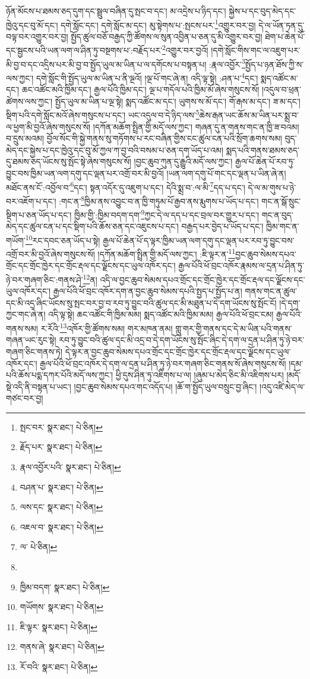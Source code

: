 ཉོན་མོངས་པ་ཐམས་ཅད་དུག་དང་སྦྲུལ་བཞིན་དུ་སྤང་བ་དང་། མ་འདྲེས་པ་ཉིད་དང་། སྐྱེས་པ་དང་བུད་མེད་དང་ཁྱེའུ་དང་བུ་མོ་དང་། དགེ་སློང་དང་། དགེ་སློང་མ་དང་། མུ་སྟེགས་པ་:སྤངས་པར་\footnote{སྤང་བར་  སྣར་ཐང་།  པེ་ཅིན། }འགྱུར་བར་བྱ། དེ་ལ་ཡོན་ཏན་དུ་བལྟ་བར་འགྱུར་བར་བྱ། སྤྱོད་ཚུལ་བཅོ་བརྒྱད་ཀྱི་ཚོགས་ལ་སུན་འབྱིན་པ་ཅན་དུ་མི་འགྱུར་བར་བྱ། ཐེག་པ་ཆེན་པོ་དང་སྦྱངས་པའི་ཡན་ལག་ལ་ཤིན་ཏུ་བསྔགས་པ་:བརྗོད་པར་\footnote{རྗོད་པར་  སྣར་ཐང་།  པེ་ཅིན། }འགྱུར་བར་བྱའོ། །དགེ་སློང་གིས་གང་ལ་འཇུག་པར་མི་བྱ་བ་དང་འདྲིས་པར་མི་བྱ་བ་སྤྱོད་ཡུལ་མ་ཡིན་པ་ལ་དགོངས་པ་བསྟན་པ། :རྣལ་འབྱོར་\footnote{རྣལ་འབྱོར་པའི་  སྣར་ཐང་།  པེ་ཅིན། }སྤྱོད་པ་ཉན་ཐོས་ཀྱི་ས་ལས་ཀྱང་། དགེ་སློང་གི་སྤྱོད་ཡུལ་མ་ཡིན་པ་ནི་ལྔའོ། །ལྔ་པོ་གང་ཞེ་ན། འདི་ལྟ་སྟེ། :ཤན་པ་\footnote{བཤན་པ་  སྣར་ཐང་།  པེ་ཅིན། }དང་། སྨད་འཚོང་མ་དང་། ཆང་འཚོང་མའི་ཁྱིམ་དང་། རྒྱལ་པོའི་ཁྱིམ་དང་། ལྔ་པ་གདོལ་པའི་ཁྱིམ་མོ་ཞེས་གསུངས་སོ། །འདུལ་བ་ཕྲན་ཚེགས་ལས་ཀྱང་། སྤྱོད་ཡུལ་མ་ཡིན་པ་ལྔ་སྟེ། སྨད་འཚོང་མ་དང་། ཡུགས་ས་མོ་དང་། གོ་རྒས་མ་དང་། ཟ་མ་དང་། སྡིག་པའི་དགེ་སློང་མའོ་ཞེས་གསུངས་པ་དང་། ཡང་འདུལ་བ་དེ་ཉིད་ལས་\footnote{ལས་དང་  སྣར་ཐང་།  པེ་ཅིན། }ཆེས་རྒན་ཡང་ཆོས་མ་ཡིན་པར་སྨྲ་བ་ལ་ཕྱག་མི་བྱའོ་ཞེས་གསུངས་སོ། །དཀོན་མཆོག་སྤྲིན་གྱི་མདོ་ལས་ཀྱང་། གཞན་དུ་ན་གནས་གང་ན་ཁྱི་ཟ་བའམ། བ་དྲུས་མའམ། བྱོལ་སོང་གི་སྐྱེ་གནས་སུ་གཏོགས་པ་རང་བཞིན་གྱིས་ངང་ཚུལ་ངན་པའི་སྲོག་ཆགས་སམ། བུད་མེད་དང་སྐྱེས་པ་དང་ཁྱེའུ་དང་བུ་མོ་ཀྱལ་ཀ་བྱ་བའི་བསམ་པ་ཅན་དག་ཡོད་པ་འམ། སྨད་པའི་གནས་ཐམས་ཅད་དུ་ཐམས་ཅད་ཡོངས་སུ་སྤོང་སྟེ་ཞེས་གསུངས་སོ། །བྱང་ཆུབ་ཀུན་དུ་རྒྱུའི་མདོ་ལས་ཀྱང་། རྒྱལ་པོ་ཆེན་པོ་རབ་ཏུ་བྱུང་བས་ཁྱིམ་ཡན་ལག་དགུ་དང་ལྡན་པར་འགྲོ་བར་མི་བྱའོ། །ཡན་ལག་དགུ་པོ་གང་དང་ལྡན་པ་ཡིན་ཞེ་ན། མཐོང་ནས་ངོ་:འབྱོལ་བ་\footnote{འཇལ་བ་  སྣར་ཐང་།  པེ་ཅིན། }དང་། སྟན་འདོར་དུ་འཇུག་པ་དང་། དེའི་སྨྲ་བ་:ལ་མི་\footnote{ལ་  པེ་ཅིན། }དད་པ་དང་། དེ་ལ་མ་གུས་པ་ཉེ་བར་འཇོག་པ་དང་། :གང་ན་\footnote{}ཁྱིམ་ནས་འབྱུང་བ་ན་ཁྱི་གཏུམ་པོ་རྒྱབ་ནས་རྨུགས་པ་ཡོད་པ་དང་། གང་ན་སྒོ་སྲུང་སྡིག་པ་ཅན་ཡོད་པ་དང་། ཁྱིམ་གྱི་:ཁྱིམ་བདག་དག་\footnote{ཁྱིམ་བདག་  སྣར་ཐང་།  པེ་ཅིན། }ཀྱང་དེ་ལ་དད་པ་དང་བྲལ་བར་གྱུར་པ་དང་། གང་ན་བུད་མེད་དང་ཚུལ་ངན་པ་དང་སྡིག་པའི་ཆོས་ཅན་དང་འཇུངས་པ་དང་། བརྒྱད་པར་བྱེད་པ་ཡོད་པ་དང་། ཁྱིམ་གང་ན་གཡོག་\footnote{གཡོགས་  སྣར་ཐང་།  པེ་ཅིན། }རང་དབང་ཅན་ཡོད་པ་སྟེ། རྒྱལ་པོ་ཆེན་པོ་ད་ལྟར་ཁྱིམ་ཡན་ལག་དགུ་དང་ལྡན་པར་རབ་ཏུ་བྱུང་བས་འགྲོ་བར་མི་བྱའོ་ཞེས་གསུངས་སོ། །དཀོན་མཆོག་སྤྲིན་གྱི་མདོ་ལས་ཀྱང་། :ཇི་ལྟར་ན་\footnote{ཇི་ལྟར་  སྣར་ཐང་།  པེ་ཅིན། }བྱང་ཆུབ་སེམས་དཔའ་གྲོང་དང་གྲོང་ཁྱེར་དང་གྲོང་རྡལ་དང་ལྗོངས་དང་ཡུལ་འཁོར་དང་། རྒྱལ་པོའི་ཕོ་བྲང་འཁོར་རྣམས་ལ་དྲན་པ་ཤིན་ཏུ་ཉེ་བར་གཞག་ཅིང་:གནས་ཤེ་\footnote{གནས་ཞེ་  སྣར་ཐང་།  པེ་ཅིན། }ན། འདི་ལ་བྱང་ཆུབ་སེམས་དཔའ་གྲོང་དང་གྲོང་ཁྱེར་དང་གྲོང་རྡལ་དང་ལྗོངས་དང་ཡུལ་འཁོར་དང་། རྒྱལ་པོའི་ཕོ་བྲང་འཁོར་དག་ན་བྱང་ཆུབ་སེམས་དཔའི་སྤྱད་པ་སྤྱོད་པ་ན། གནས་གང་ན་ཚུལ་དང་མི་འདྲ་ཞིང་ཡོངས་སུ་སྤང་བར་བྱ་བ་རབ་ཏུ་བྱུང་བའི་ཚུལ་དང་མི་མཐུན་པ་དེ་དག་ཡོངས་སུ་སྤོང་ངོ། །དེ་དག་ཀྱང་གང་ཞེ་ན། འདི་ལྟ་སྟེ། ཆང་འཚོང་གི་ཁྱིམ་མམ། སྨད་འཚོང་མའི་ཁྱིམ་མམ། རྒྱལ་པོའི་ཕོ་བྲང་ངམ། རྒྱལ་པོའི་གནས་སམ། ར་རོའི་\footnote{རོ་བའི་  སྣར་ཐང་།  པེ་ཅིན། }འཁོར་གྱི་ཚོགས་སམ། གར་མཁན་ནམ། གླུ་གར་གྱི་གནས་དང་དེ་མ་ཡིན་པའི་གནས་གཞན་ཡང་རུང་སྟེ། རབ་ཏུ་བྱུང་བའི་ཚུལ་དང་མི་འདྲ་བ་དེ་དག་ཡོངས་སུ་སྤོང་ཞིང་དེ་དག་ལ་དྲན་པ་ཤིན་ཏུ་ཉེ་བར་གཞག་ཅིང་གནས་ཏེ། དེ་ལྟར་ན་བྱང་ཆུབ་སེམས་དཔའ་གྲོང་དང་གྲོང་ཁྱེར་དང་གྲོང་རྡལ་དང་ལྗོངས་དང་ཡུལ་འཁོར་དང་། རྒྱལ་པོའི་ཕོ་བྲང་འཁོར་དེ་དག་ལ་དྲན་པ་ཤིན་ཏུ་ཉེ་བར་གཞག་ཅིང་གནས་སོ་ཞེས་གསུངས་སོ། །དམ་པའི་ཆོས་པདྨ་དཀར་པོའི་མདོ་ལས་ཀྱང་། ཕྱི་དུས་ཤིན་ཏུ་འཇིགས་པ་ལ། །ཞུམ་པ་མེད་ཅིང་མི་འཇིགས་པར། །མདོ་སྡེ་འདི་ནི་བསྟན་པ་ཡང་། །བྱང་ཆུབ་སེམས་དཔའ་གང་འདོད་པ། །ཆོ་ག་སྤྱོད་ཡུལ་བསྲུང་བྱ་ཞིང་། །འདུ་འཛི་མེད་ལ་གཙང་བར་བྱ། 